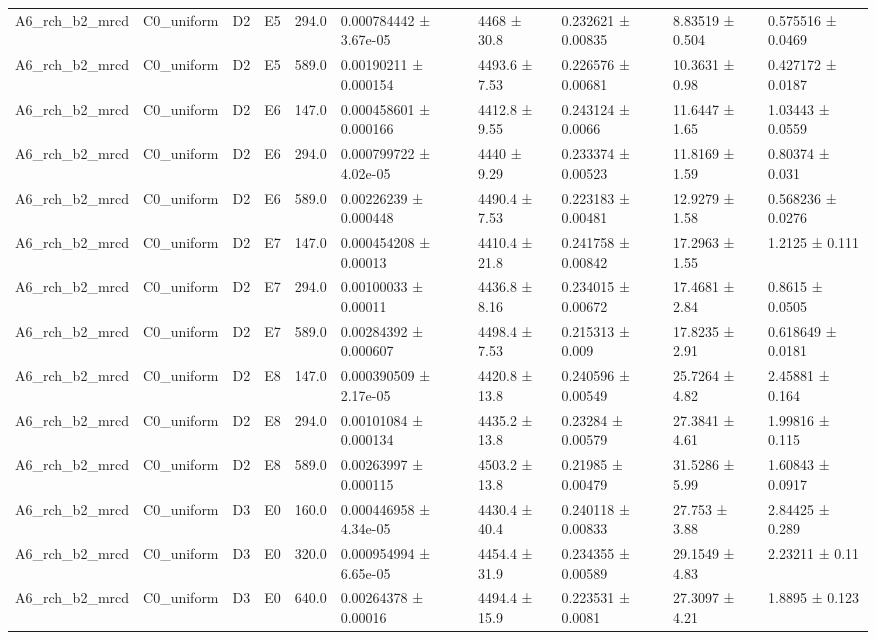 \begin{table}
\begin{tabular}{llllllllll}
A6\_rch\_b2\_mrcd & C0\_uniform & D2 & E5 & 294.0 & 0.000784442 ± 3.67e-05 & 4468 ± 30.8 & 0.232621 ± 0.00835 & 8.83519 ± 0.504 & 0.575516 ± 0.0469 \\
A6\_rch\_b2\_mrcd & C0\_uniform & D2 & E5 & 589.0 & 0.00190211 ± 0.000154 & 4493.6 ± 7.53 & 0.226576 ± 0.00681 & 10.3631 ± 0.98 & 0.427172 ± 0.0187 \\
A6\_rch\_b2\_mrcd & C0\_uniform & D2 & E6 & 147.0 & 0.000458601 ± 0.000166 & 4412.8 ± 9.55 & 0.243124 ± 0.0066 & 11.6447 ± 1.65 & 1.03443 ± 0.0559 \\
A6\_rch\_b2\_mrcd & C0\_uniform & D2 & E6 & 294.0 & 0.000799722 ± 4.02e-05 & 4440 ± 9.29 & 0.233374 ± 0.00523 & 11.8169 ± 1.59 & 0.80374 ± 0.031 \\
A6\_rch\_b2\_mrcd & C0\_uniform & D2 & E6 & 589.0 & 0.00226239 ± 0.000448 & 4490.4 ± 7.53 & 0.223183 ± 0.00481 & 12.9279 ± 1.58 & 0.568236 ± 0.0276 \\
A6\_rch\_b2\_mrcd & C0\_uniform & D2 & E7 & 147.0 & 0.000454208 ± 0.00013 & 4410.4 ± 21.8 & 0.241758 ± 0.00842 & 17.2963 ± 1.55 & 1.2125 ± 0.111 \\
A6\_rch\_b2\_mrcd & C0\_uniform & D2 & E7 & 294.0 & 0.00100033 ± 0.00011 & 4436.8 ± 8.16 & 0.234015 ± 0.00672 & 17.4681 ± 2.84 & 0.8615 ± 0.0505 \\
A6\_rch\_b2\_mrcd & C0\_uniform & D2 & E7 & 589.0 & 0.00284392 ± 0.000607 & 4498.4 ± 7.53 & 0.215313 ± 0.009 & 17.8235 ± 2.91 & 0.618649 ± 0.0181 \\
A6\_rch\_b2\_mrcd & C0\_uniform & D2 & E8 & 147.0 & 0.000390509 ± 2.17e-05 & 4420.8 ± 13.8 & 0.240596 ± 0.00549 & 25.7264 ± 4.82 & 2.45881 ± 0.164 \\
A6\_rch\_b2\_mrcd & C0\_uniform & D2 & E8 & 294.0 & 0.00101084 ± 0.000134 & 4435.2 ± 13.8 & 0.23284 ± 0.00579 & 27.3841 ± 4.61 & 1.99816 ± 0.115 \\
A6\_rch\_b2\_mrcd & C0\_uniform & D2 & E8 & 589.0 & 0.00263997 ± 0.000115 & 4503.2 ± 13.8 & 0.21985 ± 0.00479 & 31.5286 ± 5.99 & 1.60843 ± 0.0917 \\
A6\_rch\_b2\_mrcd & C0\_uniform & D3 & E0 & 160.0 & 0.000446958 ± 4.34e-05 & 4430.4 ± 40.4 & 0.240118 ± 0.00833 & 27.753 ± 3.88 & 2.84425 ± 0.289 \\
A6\_rch\_b2\_mrcd & C0\_uniform & D3 & E0 & 320.0 & 0.000954994 ± 6.65e-05 & 4454.4 ± 31.9 & 0.234355 ± 0.00589 & 29.1549 ± 4.83 & 2.23211 ± 0.11 \\
A6\_rch\_b2\_mrcd & C0\_uniform & D3 & E0 & 640.0 & 0.00264378 ± 0.00016 & 4494.4 ± 15.9 & 0.223531 ± 0.0081 & 27.3097 ± 4.21 & 1.8895 ± 0.123 \\

\end{tabular}
\end{table}
